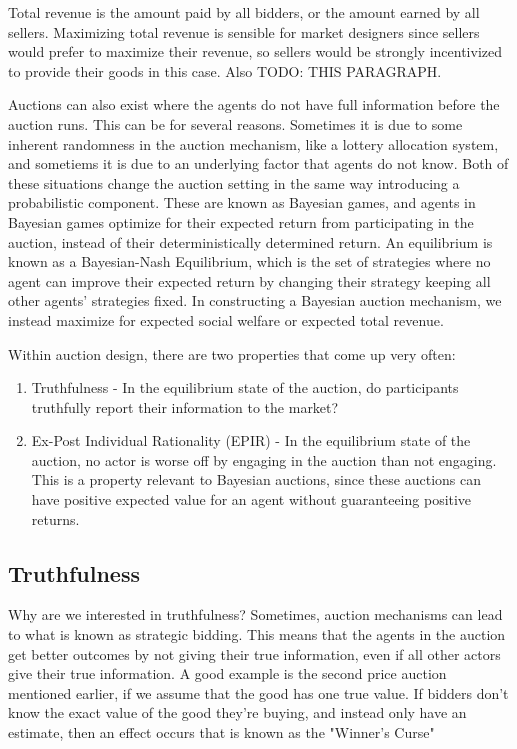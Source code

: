 Total revenue is the amount paid by all bidders, or the amount earned by all
sellers. Maximizing total revenue is sensible for market designers since
sellers would prefer to maximize their revenue, so sellers would be strongly
incentivized to provide their goods in this case. Also TODO: THIS PARAGRAPH.


Auctions can also exist where the agents do not have full information before
the auction runs. This can be for several reasons. Sometimes it is due to some
inherent randomness in the auction mechanism, like a lottery allocation system,
and sometiems it is due to an underlying factor that agents do not know. Both
of these situations change the auction setting in the same way introducing a
probabilistic component. These are known as Bayesian games, and agents in
Bayesian games optimize for their expected return from participating in the
auction, instead of their deterministically determined return. An equilibrium
is known as a Bayesian-Nash Equilibrium, which is the set of strategies where
no agent can improve their expected return by changing their strategy keeping
all other agents' strategies fixed. In constructing a Bayesian auction
mechanism, we instead maximize for expected social welfare or expected total
revenue.

Within auction design, there are two properties that come up very often:
\begin{enumerate}

    \item Truthfulness - In the equilibrium state of the auction,
          do participants truthfully report their information to the market?

    \item Ex-Post Individual Rationality (EPIR) - In the equilibrium state of
          the auction, no actor is worse off by engaging in the auction than not
          engaging. This is a property relevant to Bayesian auctions, since these
          auctions can have positive expected value for an agent without
          guaranteeing positive returns.

\end{enumerate}


\subsection{Truthfulness} Why are we interested in truthfulness? Sometimes,
auction mechanisms can lead to what is known as strategic bidding. This means
that the agents in the auction get better outcomes by not giving their true
information, even if all other actors give their true information. A good
example is the second price auction mentioned earlier, if we assume that the
good has one true value. If bidders don't know the exact value of the good
they're buying, and instead only have an estimate, then an effect occurs that
is known as the "Winner's Curse"

